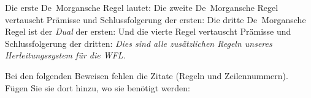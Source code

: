 Die erste De~Morgansche Regel lautet:
Die zweite De~Morgansche Regel vertauscht Prämisse und Schlussfolgerung der ersten:
Die dritte De~Morgansche Regel ist der \emph{Dual} der ersten:
Und die vierte Regel vertauscht Prämisse und Schlussfolgerung der dritten:
\emph{Dies sind alle zusätzlichen Regeln unseres Herleitungssystem für die WFL.}

\practiceproblems
\solutions
\problempart
\label{pr.justifyTFLproof}
Bei den folgenden Beweisen fehlen die Zitate (Regeln und Zeilennummern). Fügen Sie sie dort hinzu, wo sie benötigt werden:
\begin{earg}
\item 
	\begin{fitchproof}
 {}
 {}
\end{fitchproof}
\item\begin{fitchproof}
\open
\close
{}
\end{fitchproof}
\item\begin{fitchproof}
\open
	 {}
		\open
	\close
\close
{}
\end{fitchproof}
\end{earg}

